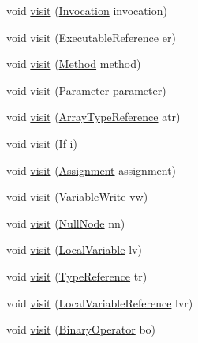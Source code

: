 \begin{DoxyCompactItemize}
\item 
void \hyperlink{classmain_1_1_pattern_matcher_a953fb83705d1f71e5b943b4aa349cd3a}{visit} (\hyperlink{classparser_1_1_invocation}{Invocation} invocation)
\item 
void \hyperlink{classmain_1_1_pattern_matcher_a39d7e87446fc0c53861eca5691c1f4fb}{visit} (\hyperlink{classparser_1_1_executable_reference}{Executable\+Reference} er)
\item 
void \hyperlink{classmain_1_1_pattern_matcher_a1a49bb0e153416b0227b15eef172b896}{visit} (\hyperlink{classparser_1_1_method}{Method} method)
\item 
void \hyperlink{classmain_1_1_pattern_matcher_a2912a8a07728cd1aca0d99a1dcda2c0f}{visit} (\hyperlink{classparser_1_1_parameter}{Parameter} parameter)
\item 
void \hyperlink{classmain_1_1_pattern_matcher_af260c01a388e6799d5cb2a3b7dd1e5b2}{visit} (\hyperlink{classparser_1_1_array_type_reference}{Array\+Type\+Reference} atr)
\item 
void \hyperlink{classmain_1_1_pattern_matcher_a39cb11695ba2e97bc75fcf7c939085cd}{visit} (\hyperlink{classparser_1_1_if}{If} i)
\item 
void \hyperlink{classmain_1_1_pattern_matcher_a9a42e86df8a8a6bbaa5fe1a7605d901e}{visit} (\hyperlink{classparser_1_1_assignment}{Assignment} assignment)
\item 
void \hyperlink{classmain_1_1_pattern_matcher_aa35347dcac52304e95e6fc98bf520f65}{visit} (\hyperlink{classparser_1_1_variable_write}{Variable\+Write} vw)
\item 
void \hyperlink{classmain_1_1_pattern_matcher_a8e6f8b4fb360521174c69d42aa29796d}{visit} (\hyperlink{classparser_1_1_null_node}{Null\+Node} nn)
\item 
void \hyperlink{classmain_1_1_pattern_matcher_a0247ff506d83189db0588e9dd4a72333}{visit} (\hyperlink{classparser_1_1_local_variable}{Local\+Variable} lv)
\item 
void \hyperlink{classmain_1_1_pattern_matcher_ab663c064fb8bd356bd2b1c92701cead5}{visit} (\hyperlink{classparser_1_1_type_reference}{Type\+Reference} tr)
\item 
void \hyperlink{classmain_1_1_pattern_matcher_a7b80d4e1abb3c5535efc1d3cb130fda8}{visit} (\hyperlink{classparser_1_1_local_variable_reference}{Local\+Variable\+Reference} lvr)
\item 
void \hyperlink{classmain_1_1_pattern_matcher_ae7db0f79a6d993b1ac21dd053efe39de}{visit} (\hyperlink{classparser_1_1_binary_operator}{Binary\+Operator} bo)
\item 

\end{DoxyCompactItemize}
